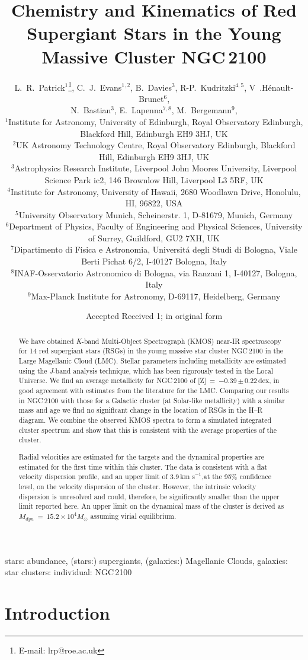 \documentclass[useAMS,usenatbib]{mn2e}
\title[Chemistry and Kinematics of NGC\,2100]{Chemistry and Kinematics of Red Supergiant Stars in the Young Massive Cluster NGC\,2100}
\author[L.~R.~Patrick et al.]{L.~R.~Patrick$^{1}$\thanks{E-mail: lrp@roe.ac.uk},
C.~J.~Evans$^{1, 2}$,
B.~Davies$^{3}$,
R-P.~Kudritzki$^{4,5}$,
V~.H{\'e}nault-Brunet$^{6}$,\\
\newauthor N.~Bastian$^{3}$,
E.~Lapenna$^{7,8}$, M.~Bergemann$^{9}$,\\
$^{1}$Institute for Astronomy, University of Edinburgh, Royal Observatory Edinburgh, Blackford Hill, Edinburgh EH9 3HJ, UK\\
$^{2}$UK Astronomy Technology Centre, Royal Observatory Edinburgh, Blackford Hill, Edinburgh EH9 3HJ, UK\\
$^{3}$Astrophysics Research Institute, Liverpool John Moores University, Liverpool Science Park ic2, 146 Brownlow Hill, Liverpool L3 5RF, UK\\
$^{4}$Institute for Astronomy, University of Hawaii, 2680 Woodlawn Drive, Honolulu, HI, 96822, USA\\
$^{5}$University Observatory Munich, Scheinerstr. 1, D-81679, Munich, Germany\\
$^{6}$Department of Physics, Faculty of Engineering and Physical Sciences, University of Surrey, Guildford, GU2 7XH, UK\\
$^{7}$Dipartimento di Fisica e Astronomia, Universit\'a degli Studi di Bologna, Viale Berti Pichat 6/2, I-40127 Bologna, Italy\\
$^{8}$INAF-Osservatorio Astronomico di Bologna, via Ranzani 1, I-40127, Bologna, Italy\\
$^{9}$Max-Planck Institute for Astronomy, D-69117, Heidelberg, Germany\\
}
\def\kms{$\mbox{km s}^{-1}$}
\begin{document}
\date{Accepted  Received 1; in original form}

\pagerange{\pageref{firstpage}--\pageref{lastpage}} 

\maketitle

\label{firstpage}

\begin{abstract}

\noindent We have obtained {\it K}-band Multi-Object Spectrograph (KMOS) near-IR spectroscopy for 14 red supergiant stars (RSGs) in the young massive star cluster NGC\,2100 in the Large Magellanic Cloud (LMC).
Stellar parameters including metallicity are estimated using the {\it J}-band analysis technique, which has been rigorously tested in the Local Universe.
We find an average metallicity for NGC\,2100 of [Z]~=~$-$0.39\,$\pm$\,0.22\,dex, in good agreement with estimates from the literature for the LMC.
Comparing our results in NGC\,2100 with those for a Galactic cluster (at Solar-like metallicity) with a similar mass and age we find no significant change in the location of RSGs in the H--R diagram.
We combine the observed KMOS spectra to form a simulated integrated cluster spectrum and show that this is consistent with the average properties of the cluster.

Radial velocities are estimated for the targets and the dynamical properties are estimated for the first time within this cluster.
The data is consistent with a flat velocity dispersion profile, and an upper limit of 3.9\,\kms,at the 95\% confidence level, on the velocity dispersion of the cluster.
However, the intrinsic velocity dispersion is unresolved and could, therefore, be significantly smaller than the upper limit reported here.
An upper limit on the dynamical mass of the cluster is derived as
$M_{dyn}$~=~$15.2\times10^{4}M_{\odot}$ assuming virial equilibrium.
\end{abstract}

\begin{keywords}
stars: abundance, (stars:) supergiants, (galaxies:) Magellanic Clouds, galaxies: star clusters: individual: NGC\,2100
\end{keywords}

\section{Introduction} %
\label{sec:introduction}
\end{document}
